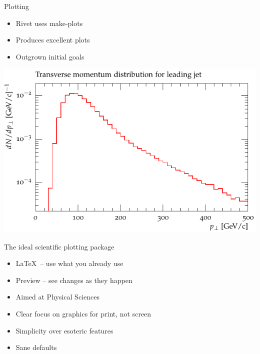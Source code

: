 \documentclass{beamer}
\begin{document}
  \begin{frame}{Plotting}
    \begin{itemize}[<uncover@+>]
      \item Rivet uses make-plots
      \item Produces excellent plots
      \item Outgrown initial goals
    \end{itemize}
  \end{frame}
  \begin{frame}
    \includegraphics[width=\textwidth]{makeplots}
  \end{frame}

  \begin{frame}{The ideal scientific plotting package}
    \begin{itemize}[<uncover@+>]
      \item \LaTeX\ -- use what you already use
      \item Preview -- see changes as they happen
      \item Aimed at Physical Sciences
      \item Clear focus on graphics for print, not screen
      \item Simplicity over esoteric features
      \item Sane defaults
    \end{itemize}
  \end{frame}
\end{document}
